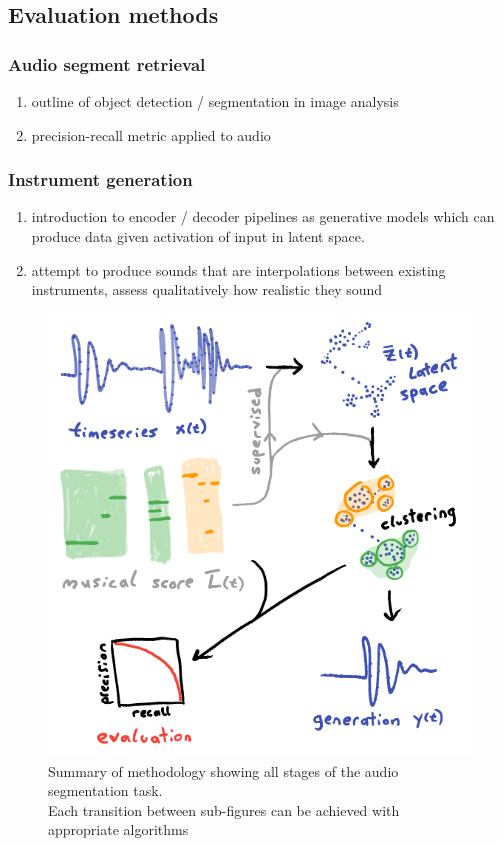 \documentclass{article}[12pt]
\numberwithin{equation}{section}
\begin{document}
\subsection{Evaluation methods}
\subsubsection{Audio segment retrieval}
\begin{enumerate}
	\item outline of object detection / segmentation in image analysis
	\item precision-recall metric applied to audio
\end{enumerate}
\subsubsection{Instrument generation}
\begin{enumerate}
	\item introduction to encoder / decoder pipelines as generative models which
	can produce data given activation of input in latent space.
	\item attempt to produce sounds that are interpolations between
	existing instruments, assess qualitatively how realistic they sound
\end{enumerate}


\begin{figure}[H]
\centering{}
\captionsetup{justification=centering}
\includegraphics[scale=0.5]{methods}
\caption{Summary of methodology showing all stages of the audio segmentation task.\\
Each transition between sub-figures can be achieved with appropriate algorithms
}
\label{fig:methods}
\end{figure}
\end{document}
